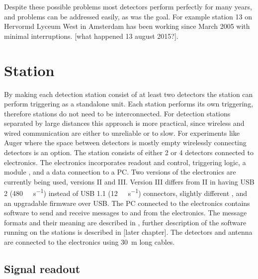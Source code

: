 Despite these possible problems most detectors perform perfectly for many years, and problems can be addressed easily, as was the goal. For example station 13 on Hervormd Lyceum West in Amsterdam has been working since March 2005 with minimal interruptions. [what happened 13 august 2015?].











\section{Station}

By making each detection station consist of at least two detectors the station can perform triggering as a standalone unit. Each station performs its own triggering, therefore stations do not need to be interconnected. For detection stations separated by large distances this approach is more practical, since wireless and wired communication are either to unreliable or to slow. For experiments like Auger where the space between detectors is mostly empty wirelessly connecting detectors is an option. The \hisparc station consists of either 2 or 4 detectors connected to \hisparc electronics. The \hisparc electronics incorporates \pmt readout and control, triggering logic, a \gps module \cite{trimble2007resolutiont}, and a data connection to a PC. Two versions of the electronics are currently being used, versions II and III. Version III differs from II in having USB 2 (\SI{480}{\mega\bit\per\second}) instead of USB 1.1 (\SI{12}{\mega\bit\per\second}) connectors, slightly different \adcs, and an upgradable firmware over USB. The PC connected to the electronics contains software to send and receive messages to and from the \hisparc electronics. The message formats and their meaning are described in \cite{verkooijen2008firmware}, further description of the software running on the stations is described in [later chapter]. The detectors and \gps antenna \cite{trimble2015bullet} are connected to the electronics using \SI{30}{\meter} long cables.

\subsection{Signal readout}

